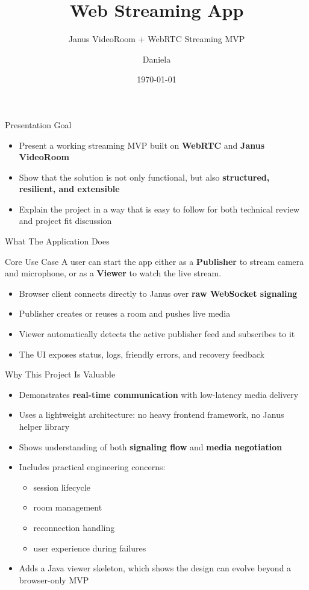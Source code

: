 \documentclass[aspectratio=169]{beamer}
\title{Web Streaming App}
\subtitle{Janus VideoRoom + WebRTC Streaming MVP}
\author{Daniela}
\date{\today}
\begin{document}
\begin{frame}
  \titlepage
\end{frame}

\begin{frame}{Presentation Goal}
  \begin{itemize}
    \item Present a working streaming MVP built on \textbf{WebRTC} and \textbf{Janus VideoRoom}
    \item Show that the solution is not only functional, but also \textbf{structured, resilient, and extensible}
    \item Explain the project in a way that is easy to follow for both technical review and project fit discussion
  \end{itemize}
\end{frame}

\begin{frame}{What The Application Does}
  \begin{block}{Core Use Case}
    A user can start the app either as a \textbf{Publisher} to stream camera and microphone, or as a \textbf{Viewer} to watch the live stream.
  \end{block}

  \vspace{0.4em}
  \begin{itemize}
    \item Browser client connects directly to Janus over \textbf{raw WebSocket signaling}
    \item Publisher creates or reuses a room and pushes live media
    \item Viewer automatically detects the active publisher feed and subscribes to it
    \item The UI exposes status, logs, friendly errors, and recovery feedback
  \end{itemize}
\end{frame}

\begin{frame}{Why This Project Is Valuable}
  \begin{itemize}
    \item Demonstrates \textbf{real-time communication} with low-latency media delivery
    \item Uses a lightweight architecture: no heavy frontend framework, no Janus helper library
    \item Shows understanding of both \textbf{signaling flow} and \textbf{media negotiation}
    \item Includes practical engineering concerns:
    \begin{itemize}
      \item session lifecycle
      \item room management
      \item reconnection handling
      \item user experience during failures
    \end{itemize}
    \item Adds a Java viewer skeleton, which shows the design can evolve beyond a browser-only MVP
  \end{itemize}
\end{frame}
\end{document}
